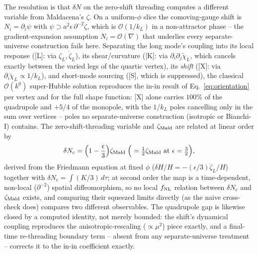 \documentclass[aps,prd,twocolumn,superscriptaddress,nofootinbib,longbibliography]{revtex4-2}
\begin{document}
The resolution is that $\delta N$ on the zero-shift threading computes a
different variable from Maldacena's $\zeta$. On a uniform-$\phi$ slice the
comoving-gauge shift is $N_i=\partial_i\psi$ with $\psi\supset
a^2\epsilon\,\partial^{-2}\dot\zeta$, which is $\mathcal O(1/k_L)$ in a
non-attractor phase -- the gradient-expansion assumption $N_i=\mathcal
O(\nabla)$ that underlies every separate-universe construction fails here.
Separating the long mode's coupling into its local response ([L]: via
$\zeta_L,\dot\zeta_L$), its shear/curvature ([K]: via
$\partial_i\partial_j\tilde\chi_L$, which cancels exactly between the varied
legs of the quartic vertex), its \emph{shift} ([X]: via
$\partial_i\tilde\chi_L\propto1/k_L$), and short-mode sourcing ([S], which is
suppressed), the classical $\mathcal O(k^0)$ super-Hubble solution reproduces
the in-in result of Eq.~\eqref{eq:orientation} per vertex and for the full
shape function: [X] alone carries $100\%$ of the quadrupole and $+5/4$ of the
monopole, with the $1/k_L$ poles cancelling only in the sum over vertices --
poles no separate-universe construction (isotropic or Bianchi-I) contains.
The zero-shift-threading variable and $\zeta_{\rm Mald}$ are related at linear
order by
\begin{equation}
  \delta N_c = \Big(1-\frac{\epsilon}{3}\Big)\zeta_{\rm Mald}
  \;\Big(=\tfrac12\zeta_{\rm Mald}\ \text{at}\ \epsilon=\tfrac32\Big),
  \label{eq:deltaNc}
\end{equation}
derived from the Friedmann equation at fixed $\phi$ ($\delta H/H
=-(\epsilon/3)\dot\zeta_L/H$) together with $\delta N_c=\int(K/3)\,d\tau$; at
second order the map is a time-dependent, non-local ($\partial^{-2}$) spatial
diffeomorphism, so no local $f_{\rm NL}$ relation between $\delta N_c$ and
$\zeta_{\rm Mald}$ exists, and comparing their squeezed limits directly (as
the naive cross-check does) compares two different observables. The
quadrupole gap is likewise closed by a computed identity, not merely
bounded: the shift's
dynamical coupling reproduces the anisotropic-rescaling ($\propto\mu^2$)
piece exactly, and a final-time re-threading boundary term -- absent from any
separate-universe treatment -- corrects it to the in-in coefficient exactly.
\end{document}
